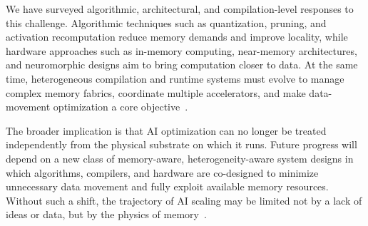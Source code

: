 \documentclass[conference]{IEEEtran}
\begin{document}
We have surveyed algorithmic, architectural, and compilation-level responses to this challenge. Algorithmic techniques such as quantization, pruning, and activation recomputation reduce memory demands and improve locality, while hardware approaches such as in-memory computing, near-memory architectures, and neuromorphic designs aim to bring computation closer to data. At the same time, heterogeneous compilation and runtime systems must evolve to manage complex memory fabrics, coordinate multiple accelerators, and make data-movement optimization a core objective~\cite{bavikadi2020review,roy2025breaking,sunrise2020,wang2014memory,charlotte2024compiler}.

The broader implication is that AI optimization can no longer be treated independently from the physical substrate on which it runs. Future progress will depend on a new class of memory-aware, heterogeneity-aware system designs in which algorithms, compilers, and hardware are co-designed to minimize unnecessary data movement and fully exploit available memory resources. Without such a shift, the trajectory of AI scaling may be limited not by a lack of ideas or data, but by the physics of memory~\cite{gholami2024ai,roy2025breaking,sunrise2020}.
\end{document}
